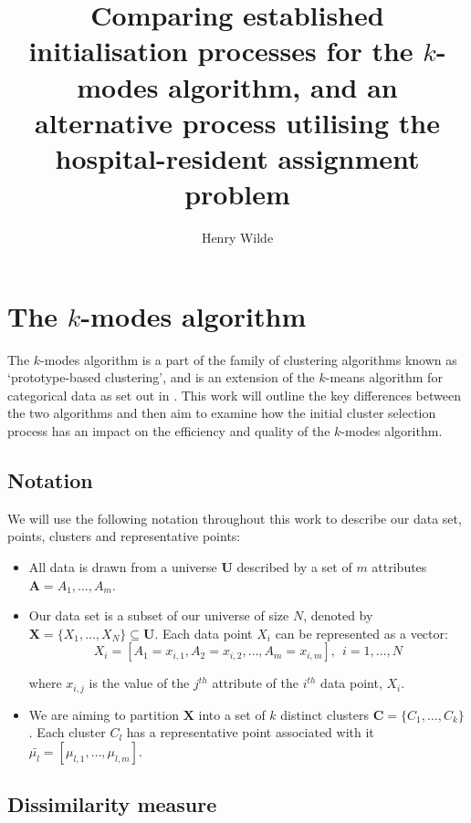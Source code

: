 \documentclass{article}
\title{Comparing established initialisation processes for the $k$-modes algorithm, and an alternative process utilising the hospital-resident assignment problem}
\author{Henry Wilde}
\theoremstyle{definition}
\begin{document}
\maketitle



\section{The $k$-modes algorithm}\label{section:kmodes}

The $k$-modes algorithm is a part of the family of clustering algorithms known as `prototype-based clustering', and is an extension of the $k$-means algorithm for categorical data as set out in \cite{Huang98}. This work will outline the key differences between the two algorithms and then aim to examine how the initial cluster selection process has an impact on the efficiency and quality of the $k$-modes algorithm. \\


\subsection{Notation}\label{subsection:notation}

We will use the following notation throughout this work to describe our data set, points, clusters and representative points:

\begin{itemize}
\item All data is drawn from a universe $\textbf{U}$ described by a set of $m$ attributes $ \textbf{A} = A_1, \ldots, A_m$.

\item Our data set is a subset of our universe of size $N$, denoted by $\textbf{X} = \{X_1, \ldots, X_N\} \subseteq \textbf{U}$. Each data point $X_i$ can be represented as a vector:
\[
X_i = [A_1 = x_{i,1}, A_2 = x_{i,2}, \ldots, A_m = x_{i,m}], \ \ i=1, \ldots, N
\]

where $x_{i,j}$ is the value of the $j^{th}$ attribute of the $i^{th}$ data point, $X_i$.

\item We are aiming to partition $\textbf{X}$ into a set of $k$ distinct clusters $\textbf{C} = \{C_1, \ldots, C_k\}$. Each cluster $C_l$ has a representative point associated with it $\bar{\mu_l} = [\mu_{l,1}, \ldots, \mu_{l,m}]$.
\end{itemize}


\subsection{Dissimilarity measure}\label{subsection:dissim}
\end{document}
